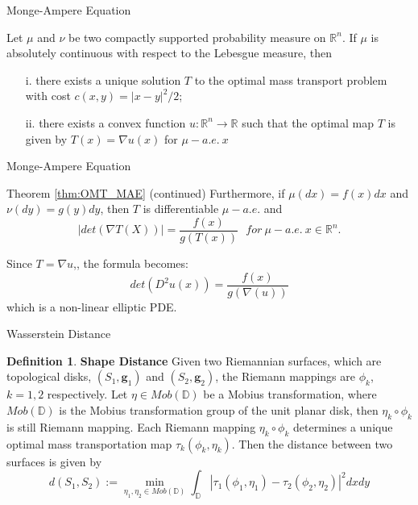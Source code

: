 \documentclass{beamer}
\theoremstyle{definition}
\newtheorem{mydef}{Definition}
\begin{document}
\begin{frame}{Monge-Ampere Equation\cite{de2014monge}}

\begin{theorem}
Let $\mu$ and $\nu$ be two compactly supported probability measure on $\mathbb{R}^n$. If $\mu$ is absolutely continuous with respect to the Lebesgue measure, then
\begin{itemize}
\item[i.] there exists a unique solution $T$ to the optimal mass transport problem with cost $c(x,y)=|x-y|^2/2$;
\item[ii.] there exists a convex function $u:\mathbb{R}^n\rightarrow\mathbb{R}$ such that the optimal map $T$ is given by $T(x)=\nabla u(x)$ for $\mu-a.e.\ x$
\end{itemize}

\label{thm:OMT_MAE}
\end{theorem}
\end{frame}

\begin{frame}{Monge-Ampere Equation}
\begin{block}{Theorem \ref{thm:OMT_MAE}}
(continued) Furthermore, if $\mu(dx)=f(x)dx$ and $\nu(dy)=g(y)dy$, then $T$ is differentiable $\mu-a.e.$ and $$|det(\nabla T(X))|=\dfrac{f(x)}{g(T(x))}\ \ \ for\ \mu-a.e.\ x\in\mathbb{R}^n.$$
\end{block}
Since $T=\nabla u$,\cite{brenier1991polar}, the formula becomes:
$$det(D^2u(x))=\dfrac{f(x)}{g(\nabla (u))}$$ which is a non-linear elliptic PDE.
\end{frame}

\begin{frame}{Wasserstein Distance}
\begin{mydef}
\textbf{Shape Distance} Given two Riemannian surfaces, which are topological disks, $(S_1,\mathbf{g}_1)$ and $(S_2,\mathbf{g}_2)$, the Riemann mappings are $\phi_k$, $k=1,2$ respectively. Let $\eta\in  Mob(\mathbb{D})$ be a Mobius transformation, where $Mob(\mathbb{D})$ is the Mobius transformation group of the unit planar disk, then $\eta_k\circ \phi_k$ is still Riemann mapping. Each Riemann mapping $\eta_k\circ \phi_k$ determines a unique optimal mass transportation map $\tau_k(\phi_k,\eta_k)$. Then the distance between two surfaces is given by $$d(S_1,S_2) := \min_{\eta_1,\eta_2\in Mob(\mathbb{D})}\int_\mathbb{D}|\tau_1(\phi_1,\eta_1)-\tau_2(\phi_2,\eta_2)|^2dxdy$$
\end{mydef}
\end{frame}
\end{document}
